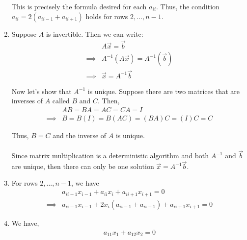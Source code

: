 \documentclass[12pt]{article}
\begin{document}
\begin{enumerate}[\alph*)]
This is precisely the formula desired for each $a_{ii}$. Thus, the condition  $a_{ii} = 2(a_{ii-1} + a_{ii+1})$ holds for rows $2, ..., n-1$.


\item Suppose $A$ is invertible. Then we can write:
\begin{align*}
&A\vec{x} = \vec{b}\\
\implies &A^{-1}(A\vec{x}) = A^{-1}(\vec{b})\\
\implies &\vec{x} = A^{-1}\vec{b}
\end{align*}

Now let's show that $A^{-1}$ is unique. Suppose there are two matrices that are inverses of $A$ called $B$ and $C$. Then,
\begin{align*}
&AB = BA = AC = CA = I\\
\implies &B = B(I) = B(AC) = (BA)C = (I)C = C
\end{align*}

Thus, $B = C$ and the inverse of $A$ is unique.\\
\\
Since matrix multiplication is a deterministic algorithm and both $A^{-1}$ and $\vec{b}$ are unique, then there can only be one solution $\vec{x} = A^{-1}\vec{b}$.

\item For rows $2, ..., n-1$, we have
\begin{align*}
&a_{ii-1}x_{i-1} + a_{ii}x_i + a_{ii+1}x_{i+1} = 0\\
\implies &a_{ii-1}x_{i-1} + 2x_i(a_{ii-1} + a_{ii+1}) + a_{ii+1}x_{i+1} = 0
\end{align*}

\item We have,
\begin{align*}
a_{11}x_1 + a_{12}x_2 = 0
\end{align*}

\end{enumerate}
\end{document}
